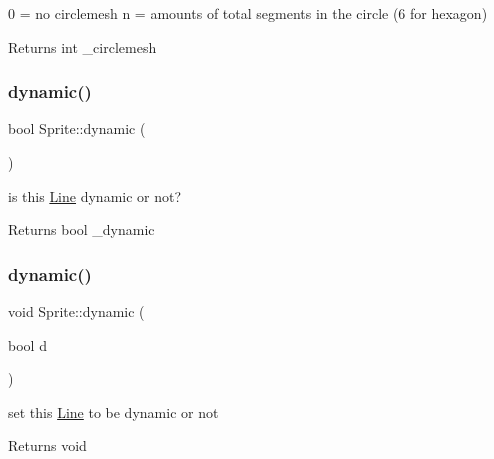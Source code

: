 0 = no circlemesh n = amounts of total segments in the circle (6 for hexagon) \begin{DoxyReturn}{Returns}
int \+\_\+circlemesh 
\end{DoxyReturn}
\mbox{\label{class_sprite_addbab8d45f865a551c5e012a4f63b8b7}} 
\subsubsection{\texorpdfstring{dynamic()}{dynamic()}\hspace{0.1cm}{\footnotesize\ttfamily [1/2]}}
{\footnotesize\ttfamily bool Sprite\+::dynamic (\begin{DoxyParamCaption}{ }\end{DoxyParamCaption})\hspace{0.3cm}{\ttfamily [inline]}}



is this \hyperlink{class_line}{Line} dynamic or not? 

\begin{DoxyReturn}{Returns}
bool \+\_\+dynamic 
\end{DoxyReturn}
\mbox{\label{class_sprite_a8164c86f45c115f8b45ddf2dc72f7be8}} 
\subsubsection{\texorpdfstring{dynamic()}{dynamic()}\hspace{0.1cm}{\footnotesize\ttfamily [2/2]}}
{\footnotesize\ttfamily void Sprite\+::dynamic (\begin{DoxyParamCaption}\item[{bool}]{d }\end{DoxyParamCaption})\hspace{0.3cm}{\ttfamily [inline]}}



set this \hyperlink{class_line}{Line} to be dynamic or not 

\begin{DoxyReturn}{Returns}
void 
\end{DoxyReturn}
\mbox{\label{class_sprite_a02160c2a56ce86d59b827899bab9c5b5}} 
